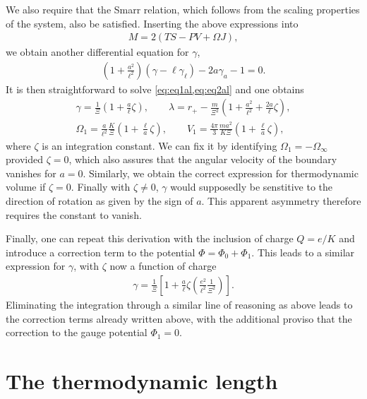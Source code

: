 \documentclass[
twoside,
openright,
frontopenright,
]{dmathesis}
\newcommand{\nn}{\nonumber}
\begin{document}
We also require that the Smarr relation, which follows from the
scaling properties of the system, also be satisfied. Inserting the above
expressions into
\begin{align}
M = 2(TS-PV+\Omega J),
\end{align}
we obtain another differential equation for $\gamma$,
\begin{align}\label{eq:eq2al}
\left(1+\frac{a^2}{\ell^2}\right)(\gamma-\ell\gamma_{\ell})-2a\gamma_{a}-1=0.
\end{align}
It is then straightforward to solve \cref{eq:eq1al,eq:eq2al} and one obtains
\begin{gather}
\gamma = \frac{1}{\Xi}\left(1+\frac{a}{\ell}\zeta\right),\qquad \lambda = r_+ -
\frac{m}{\Xi^2}\left(1+\frac{a^2}{\ell^2}+\frac{2a}{\ell}\zeta\right), \nn\\  
\Omega_1 = \frac{a}{\ell^2}\frac{K}{\Xi}\left(1+\frac{\ell}{a}\zeta\right), \qquad V_1 =
\frac{4\pi}{3}\frac{ma^2}{K\Xi}\left(1+\frac{\ell}{a}\zeta\right), 
\end{gather}
where $\zeta$ is an integration constant. We can fix it by identifying $\Omega_1
= -\Omega_\infty$ provided $\zeta = 0$, which also assures that the angular
velocity of the boundary vanishes for $a=0$. Similarly, we obtain the correct
expression for thermodynamic volume if $\zeta = 0$. Finally with $\zeta\neq 0$,
$\gamma$ would supposedly be senstitive to the direction of rotation as given by
the sign of $a$. This apparent asymmetry therefore requires the constant to vanish.

Finally, one can repeat this derivation with the inclusion of charge $Q=e/K$ and
introduce a correction term to the potential $\Phi=\Phi_0+\Phi_1$. This leads to
a similar expression for $\gamma$, with $\zeta$ now a function of charge
\begin{align}
  \gamma =
\frac{1}{\Xi}\left[1+\frac{a}{\ell}\zeta\left(\frac{e^{2}}{\ell^{2}}\frac{1}{\Xi^{2}}\right)\right].
\end{align}
Eliminating the integration through a similar line of reasoning as above leads
to the correction terms already written above, with the additional proviso that
the correction to the gauge potential $\Phi_1 = 0$.

\section{The thermodynamic length}
\end{document}
